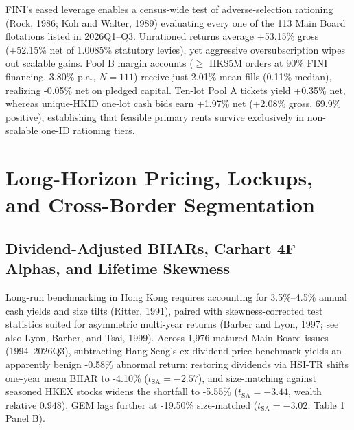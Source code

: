 \documentclass[12pt,letterpaper]{article}
\begin{document}
FINI's eased leverage enables a census-wide test of adverse-selection rationing (Rock, 1986; Koh and Walter, 1989) evaluating every one of the 113 Main Board flotations listed in 2026Q1--Q3. Unrationed returns average +53.15\% gross (+52.15\% net of 1.0085\% statutory levies), yet aggressive oversubscription wipes out scalable gains. Pool B margin accounts ($\ge$ HK\$5M orders at 90\% FINI financing, 3.80\% p.a., $N = 111$) receive just 2.01\% mean fills (0.11\% median), realizing -0.05\% net on pledged capital. Ten-lot Pool A tickets yield +0.35\% net, whereas unique-HKID one-lot cash bids earn +1.97\% net (+2.08\% gross, 69.9\% positive), establishing that feasible primary rents survive exclusively in non-scalable one-ID rationing tiers.

\section{Long-Horizon Pricing, Lockups, and Cross-Border Segmentation}

\subsection{Dividend-Adjusted BHARs, Carhart 4F Alphas, and Lifetime Skewness}

Long-run benchmarking in Hong Kong requires accounting for 3.5\%--4.5\% annual cash yields and size tilts (Ritter, 1991), paired with skewness-corrected test statistics suited for asymmetric multi-year returns (Barber and Lyon, 1997; see also Lyon, Barber, and Tsai, 1999). Across 1,976 matured Main Board issues (1994--2026Q3), subtracting Hang Seng's ex-dividend price benchmark yields an apparently benign -0.58\% abnormal return; restoring dividends via HSI-TR shifts one-year mean BHAR to -4.10\% ($t_{\text{SA}} = -2.57$), and size-matching against seasoned HKEX stocks widens the shortfall to -5.55\% ($t_{\text{SA}} = -3.44$, wealth relative 0.948). GEM lags further at -19.50\% size-matched ($t_{\text{SA}} = -3.02$; Table 1 Panel B).
\end{document}
